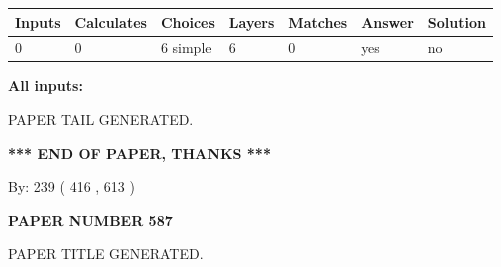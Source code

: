 \documentclass[12pt]{article}
\begin{document}
   
   
   
\noindent\begin{tabular}{|l|l|l|l|l|l|l|}
 \hline
Inputs & Calculates & Choices & Layers & Matches & Answer & Solution \\ \hline
 0  & 
 0  & 
 6
  simple  
  & 
 6  & 
 0  & 
  yes & 
  no 
  \\ \hline
 \end{tabular}
   
   
   
   
\noindent{}
   
   
   
   
\noindent\vspace{0.1in}\hspace{-0.08in} {\textbf{\Large{All inputs: }}}
   
   
   
   
   
   
 \vspace{0.2in}
 
   
   
\vspace{2.0in} PAPER TAIL GENERATED.
   
   
   
   
\vspace{1.0in} 
{\textbf{\large{ *** END OF PAPER, THANKS *** }}} 
   
   
\hspace{1.0in} By: 
 239 ( 416 ,  613 )
   
   
   
   
\newpage 
\setcounter{page}{ 
   587001 } 
   
   
   
   
 {\textbf{ \Large{ PAPER NUMBER  587  }}}
   
   
\vspace{0.2in}
   
   
   
   
   
   
   
   
 \vspace{0.2in}
 
 
 
 
   
   
 PAPER TITLE GENERATED.
   
   
   
\end{document}
